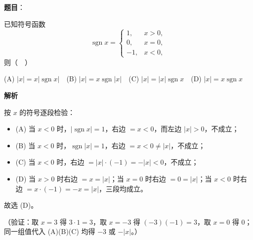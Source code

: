 \begin{answer}

\textbf{题目}：

已知符号函数
\nopagebreak[4]
\[
\operatorname{sgn}x=\begin{cases}
1, & x>0,\\
0, & x=0,\\
-1, & x<0,
\end{cases}
\]
则（　）

(A) \(|x|=x|\operatorname{sgn}x|\)　(B) \(|x|=x\operatorname{sgn}|x|\)　(C) \(|x|=|x|\operatorname{sgn}x\)　(D) \(|x|=x\operatorname{sgn}x\)

\textbf{解析}

按 \(x\) 的符号逐段检验：

\begin{itemize}
\item (A) 当 \(x<0\) 时，\(|\operatorname{sgn}x|=1\)，右边 \(=x<0\)，而左边 \(|x|>0\)，不成立；
\item (B) 当 \(x<0\) 时，\(\operatorname{sgn}|x|=1\)，右边 \(=x<0\neq|x|\)，不成立；
\item (C) 当 \(x<0\) 时，右边 \(=|x|\cdot(-1)=-|x|<0\)，不成立；
\item (D) 当 \(x>0\) 时右边 \(=x=|x|\)；当 \(x=0\) 时右边 \(=0=|x|\)；当 \(x<0\) 时右边 \(=x\cdot(-1)=-x=|x|\)，三段均成立。
\end{itemize}

故选 (D)。

（验证：取 \(x=3\) 得 \(3\cdot1=3\)，取 \(x=-3\) 得 \((-3)(-1)=3\)，取 \(x=0\) 得 \(0\)；同一组值代入 (A)(B)(C) 均得 \(-3\) 或 \(-|x|\)。）


\end{answer}
